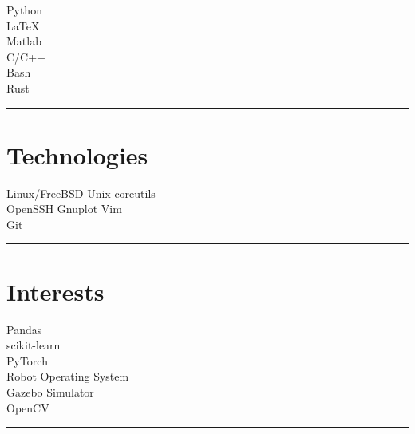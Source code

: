 \documentclass[letterpaper]{deedy-resume}
\begin{document}
\begin{minipage}[t]{0.3\textwidth}
\vspace{1em}

\textbullet{} Python \\
\textbullet{} \LaTeX \\
\textbullet{} Matlab \\
\textbullet{} C/C++ \\
\textbullet{} Bash \\
\textbullet{} Rust\\

\sectionspace %
\vspace{-1ex}
\rule{5cm}{0.5pt}
\vspace{2em}

\section{Technologies}

\vspace{1em}

Linux/FreeBSD \textbullet{} Unix coreutils\\
OpenSSH \textbullet{} Gnuplot \textbullet{} Vim\\
Git\\
\sectionspace
\vspace{-1.5ex}
\rule{5cm}{0.5pt}
\vspace{2em}


\section{Interests}

\vspace{1em}

\textbullet{} Pandas\\
\textbullet{} scikit-learn\\
\textbullet{} PyTorch\\
\vspace{1ex}
\textbullet{} Robot Operating System \\
\textbullet{} Gazebo Simulator\\
\vspace{1ex}
\textbullet{} OpenCV\\
\sectionspace
\vspace{-1ex}
\rule{5cm}{0.5pt}
\vspace{2em}


\end{minipage}
\end{document}
